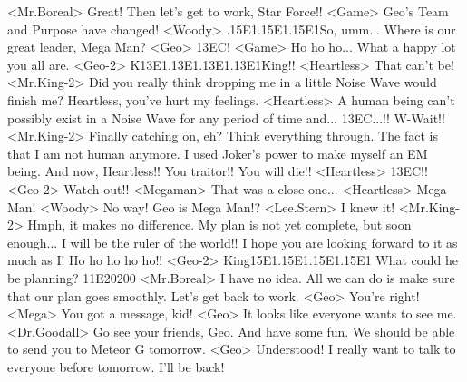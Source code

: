 <Mr.Boreal> Great! Then let's get to work, Star Force!! 
<Game> Geo's Team and Purpose have changed! 
<Woody> .{15}{E1}.{15}{E1}.{15}{E1}So, umm... Where is our great leader, Mega Man? 
<Geo> {13}{EC}! 
<Game> Ho ho ho... What a happy lot you all are. 
<Geo-2> K{13}{E1}.{13}{E1}.{13}{E1}.{13}{E1}King!! 
<Heartless> That can't be! 
<Mr.King-2> Did you really think dropping me in a little Noise Wave would finish me? 
Heartless, you've hurt my feelings. 
<Heartless> A human being can't possibly exist in a Noise Wave for any period of time and... 
{13}{EC}...!! 
W-Wait!! 
<Mr.King-2> Finally catching on, eh? Think everything through. 
The fact is that I am not human anymore. 
I used Joker's power to make myself an EM being. 
And now, Heartless!! You traitor!! You will die!! 
<Heartless> {13}{EC}!! 
<Geo-2> Watch out!! 
<Megaman> That was a close one... 
<Heartless> Mega Man! 
<Woody> No way! Geo is Mega Man!? 
<Lee.Stern> I knew it! 
<Mr.King-2> Hmph, it makes no difference. 
My plan is not yet complete, but soon enough... 
I will be the ruler of the world!! 
I hope you are looking forward to it as much as I! 
Ho ho ho ho ho!! 
<Geo-2> King{15}{E1}.{15}{E1}.{15}{E1}.{15}{E1} What could he be planning? 
{11}{E2}{02}{00} 
<Mr.Boreal> I have no idea. All we can do is make sure that our plan goes smoothly. 
Let's get back to work. 
<Geo> You're right! 
<Mega> You got a message, kid! 
<Geo> It looks like everyone wants to see me. 
<Dr.Goodall> Go see your friends, Geo. 
And have some fun. 
We should be able to send you to Meteor G tomorrow. 
<Geo> Understood! 
I really want to talk to everyone before tomorrow. 
I'll be back! 

